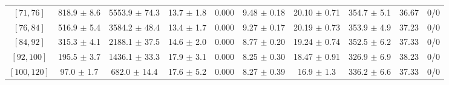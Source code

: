 \begin{tabular}{c||c|c|c|c|c|c|c||c|c}
$[71, 76]$ & 818.9 $\pm$ 8.6 & 5553.9 $\pm$ 74.3 & 13.7 $\pm$ 1.8 & 0.000 & 9.48 $\pm$ 0.18 & 20.10 $\pm$ 0.71 & 354.7 $\pm$ 5.1 & 36.67 & 0/0\\
$[76, 84]$ & 516.9 $\pm$ 5.4 & 3584.2 $\pm$ 48.4 & 13.4 $\pm$ 1.7 & 0.000 & 9.27 $\pm$ 0.17 & 20.19 $\pm$ 0.73 & 353.9 $\pm$ 4.9 & 37.23 & 0/0\\
$[84, 92]$ & 315.3 $\pm$ 4.1 & 2188.1 $\pm$ 37.5 & 14.6 $\pm$ 2.0 & 0.000 & 8.77 $\pm$ 0.20 & 19.24 $\pm$ 0.74 & 352.5 $\pm$ 6.2 & 37.33 & 0/0\\
$[92, 100]$ & 195.5 $\pm$ 3.7 & 1436.1 $\pm$ 33.3 & 17.9 $\pm$ 3.1 & 0.000 & 8.25 $\pm$ 0.30 & 18.47 $\pm$ 0.91 & 326.9 $\pm$ 6.9 & 38.23 & 0/0\\
$[100, 120]$ & 97.0 $\pm$ 1.7 & 682.0 $\pm$ 14.4 & 17.6 $\pm$ 5.2 & 0.000 & 8.27 $\pm$ 0.39 & 16.9 $\pm$ 1.3 & 336.2 $\pm$ 6.6 & 37.33 & 0/0\\
\end{tabular}
